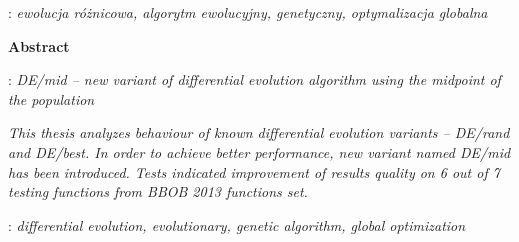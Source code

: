\begin{titlepage}
    : {\itshape ewolucja różnicowa, algorytm ewolucyjny, genetyczny, optymalizacja globalna}
    \par
    \vspace{4\baselineskip}
    \begin{center}
	{\large\bfseries Abstract}\par\bigskip
    \end{center}
    : {\itshape DE/mid -- new variant of differential evolution algorithm using the midpoint of the population}\par
    \vspace*{1\baselineskip}
    {\itshape
This thesis analyzes behaviour of known differential evolution variants -- DE/rand and DE/best.
In order to achieve better performance, new variant named DE/mid has been introduced.
Tests indicated improvement of results quality on 6 out of 7 testing functions from BBOB 2013 functions set.}
    \vspace*{1\baselineskip}

    : {\itshape differential evolution, evolutionary, genetic algorithm, global optimization
}

\end{titlepage}